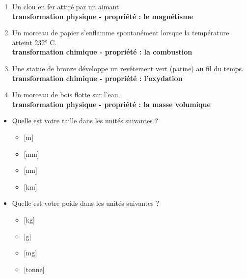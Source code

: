 \documentclass[
  11pt,
  a4paper,
  openany]{book}
\providecommand{\tightlist}{%
  \setlength{\itemsep}{0pt}\setlength{\parskip}{0pt}}
\begin{document}
\begin{Answer}

\begin{enumerate}
\def\labelenumi{\arabic{enumi}.}
\tightlist
\item
  Un clou en fer attiré par un aimant\\
  \textbf{transformation physique - propriété : le magnétisme}
\item
  Un morceau de papier s'enflamme spontanément lorsque la température atteint 232° C.\\
  \textbf{transformation chimique - propriété : la combustion}
\item
  Une statue de bronze développe un revêtement vert (patine) au fil du temps.\\
  \textbf{transformation chimique - propriété : l'oxydation}
\item
  Un morceau de bois flotte sur l'eau.\\
  \textbf{transformation physique - propriété : la masse volumique}
\end{enumerate}

\end{Answer}

\begin{Exercise}

\begin{itemize}
\tightlist
\item
  Quelle est votre taille dans les unités suivantes ?

  \begin{itemize}
  \tightlist
  \item
    {[}m{]}
  \item
    {[}mm{]}
  \item
    {[}nm{]}
  \item
    {[}km{]}
  \end{itemize}
\item
  Quelle est votre poids dans les unités suivantes ?

  \begin{itemize}
  \tightlist
  \item
    {[}kg{]}
  \item
    {[}g{]}
  \item
    {[}mg{]}
  \item
    {[}tonne{]}
  \end{itemize}
\end{itemize}

\end{Exercise}
\end{document}
